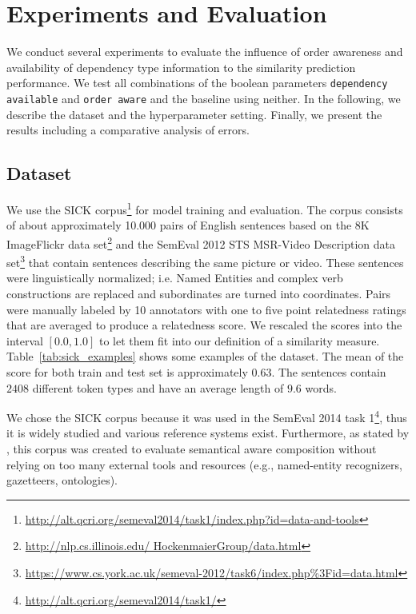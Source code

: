 \section{Experiments and Evaluation}
We conduct several experiments to evaluate the influence of order awareness and availability of dependency type information to the similarity prediction performance. We test all combinations of the boolean parameters \texttt{dependency available} and \texttt{order aware} and the baseline using neither. In the following, we describe the dataset and the hyperparameter setting. Finally, we present the results including a comparative analysis of errors.

\subsection{Dataset}
We use the SICK corpus\footnote{\url{http://alt.qcri.org/semeval2014/task1/index.php?id=data-and-tools}} \autocite{marelli_sick_2014} for model training and evaluation. The corpus consists of about approximately 10.000 pairs of English sentences based on the 8K ImageFlickr data set\footnote{\url{http://nlp.cs.illinois.edu/
HockenmaierGroup/data.html}} \autocite{hodosh_framing_2013} and the SemEval 2012 STS MSR-Video Description data set\footnote{\url{https://www.cs.york.ac.uk/semeval-2012/task6/index.php\%3Fid=data.html}} \autocite{agirre_semeval-2012_2012} that contain sentences describing the same picture or video. These sentences were linguistically normalized; i.e. Named Entities and complex verb constructions are replaced and subordinates are turned into coordinates. Pairs were manually %
labeled by 10 annotators with one to five point relatedness ratings that are averaged to produce a relatedness score. We rescaled the scores into the interval $[0.0, 1.0]$ to let them fit into our definition of a similarity measure. Table~\ref{tab:sick_examples} shows some examples of the dataset. The mean of the score for both train and test set is approximately $0.63$. The sentences contain $2408$ different token types and have an average length of $9.6$ words.  

We chose the SICK corpus because it was used in the SemEval 2014 task 1\footnote{\url{http://alt.qcri.org/semeval2014/task1/}}, thus it is widely studied and various reference systems exist. Furthermore, as stated by \textcite{marelli_semeval-2014_2014}, this corpus was created to evaluate semantical aware composition without relying on too many external tools and resources (e.g., named-entity recognizers, gazetteers, ontologies).

